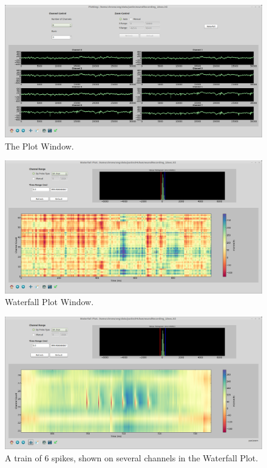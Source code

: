 \begin{figure}[h!]
\begin{center}
\includegraphics[width=17cm]{screenshots/plotwindow.png}
\end{center}
\caption{The Plot Window.}
\label{fig_plotwindow}
\end{figure}

\begin{figure}[h!]
\begin{center}
\includegraphics[width=17cm]{screenshots/waterfall.png}
\end{center}
\caption{Waterfall Plot Window.}
\label{fig_waterfall}
\end{figure}

\begin{figure}[h!]
\begin{center}
\includegraphics[width=17cm]{screenshots/waterfall_zoom.png}
\end{center}
\caption{A train of 6 spikes, shown on several channels in the Waterfall Plot.}
\label{fig_waterfall_zoom}
\end{figure}
